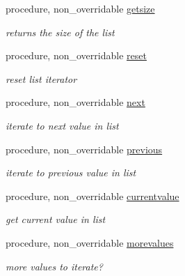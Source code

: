 \begin{DoxyCompactItemize}
procedure, non\+\_\+overridable \mbox{\hyperlink{structabstract__linkedlist__mod_1_1linkedlist_a18806ecb0fb5dea1e754de35d3700ab7}{getsize}}
\begin{DoxyCompactList}\small\item\em returns the size of the list \end{DoxyCompactList}\item 
procedure, non\+\_\+overridable \mbox{\hyperlink{structabstract__linkedlist__mod_1_1linkedlist_a3eb28d7a77ee8613ed566ec0148a1bd3}{reset}}
\begin{DoxyCompactList}\small\item\em reset list iterator \end{DoxyCompactList}\item 
procedure, non\+\_\+overridable \mbox{\hyperlink{structabstract__linkedlist__mod_1_1linkedlist_ae301aa96709e62ff823e9fd7c52ff517}{next}}
\begin{DoxyCompactList}\small\item\em iterate to next value in list \end{DoxyCompactList}\item 
procedure, non\+\_\+overridable \mbox{\hyperlink{structabstract__linkedlist__mod_1_1linkedlist_a655ba9438cdca6f2a52fd317e474fd70}{previous}}
\begin{DoxyCompactList}\small\item\em iterate to previous value in list \end{DoxyCompactList}\item 
procedure, non\+\_\+overridable \mbox{\hyperlink{structabstract__linkedlist__mod_1_1linkedlist_a01dda56c3e79f6e9f5b12df9a9ec192b}{currentvalue}}
\begin{DoxyCompactList}\small\item\em get current value in list \end{DoxyCompactList}\item 
procedure, non\+\_\+overridable \mbox{\hyperlink{structabstract__linkedlist__mod_1_1linkedlist_adac9f898125d07bacdee51f7beed0ec1}{morevalues}}
\begin{DoxyCompactList}\small\item\em more values to iterate? \end{DoxyCompactList}\end{DoxyCompactItemize}
